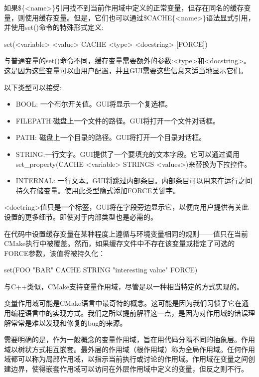 如果\$\{<name>\}引用找不到当前作用域中定义的正常变量，但存在同名的缓存变量，则使用缓存变量。但是，它们也可以通过\$CACHE\{<name>\}语法显式引用，并使用set()命令的特殊形式定义:

\begin{cmake}
set(<variable> <value> CACHE <type> <docstring> [FORCE])
\end{cmake}

与普通变量的set()命令不同，缓存变量需要额外的参数:<type>和<docstring>。这是因为这些变量可以由用户配置，并且GUI需要这些信息来适当地显示它们。

以下类型可以接受:

\begin{itemize}
\item
BOOL: 一个布尔开关值。GUI将显示一个复选框。

\item
FILEPATH:磁盘上一个文件的路径。GUI将打开一个文件对话框。

\item
PATH: 磁盘上一个目录的路径。GUI将打开一个目录对话框。

\item
STRING:一行文字。GUI提供了一个要填充的文本字段。它可以通过调用set\_property(CACHE <variable> STRINGS <values>)来替换为下拉控件。

\item
INTERNAL: 一行文本。GUI将跳过内部条目。内部条目可以用来在运行之间持久存储变量。使用此类型隐式添加FORCE关键字。
\end{itemize}

<doctring>值只是一个标签，GUI将在字段旁边显示它，以便向用户提供有关此设置的更多细节。即使对于内部类型也是必需的。

在代码中设置缓存变量在某种程度上遵循与环境变量相同的规则——值只在当前CMake执行中被覆盖。然而，如果缓存文件中不存在该变量或指定了可选的FORCE参数，该值将被持久化：

\begin{cmake}
set(FOO "BAR" CACHE STRING "interesting value" FORCE)
\end{cmake}

与C++类似，CMake支持变量作用域，尽管是以一种相当特定的方式实现的。


变量作用域可能是CMake语言中最奇特的概念。这可能是因为我们习惯了它在通用编程语言中的实现方式。我们之所以提前解释这一点，是因为对作用域的错误理解常常是难以发现和修复的bug的来源。

需要明确的是，作为一般概念的变量作用域，旨在用代码分隔不同的抽象层。作用域以树状方式相互嵌套。最外层的作用域（根作用域）称为全局作用域。任何作用域都可以称为局部作用域，以指示当前执行或讨论的作用域。作用域在变量之间创建边界，使得嵌套作用域可以访问在外层作用域中定义的变量，但反之则不行。

